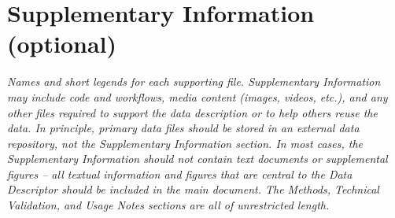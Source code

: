 \section{Supplementary Information (optional)}

\textit{Names and short legends for each supporting file.  Supplementary Information may include code and workflows, media content (images, videos, etc.), and any other files required to support the data description or to help others reuse the data.  In principle, primary data files should be stored in an external data repository, not the Supplementary Information section.  In most cases, the Supplementary Information should not contain text documents or supplemental figures – all textual information and figures that are central to the Data Descriptor should be included in the main document. The Methods, Technical Validation, and Usage Notes sections are all of unrestricted length. }
